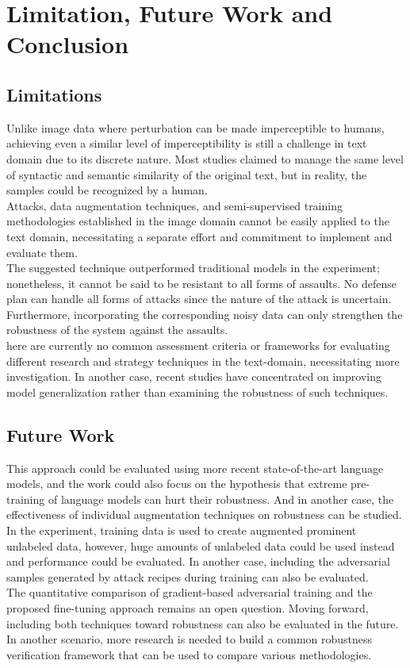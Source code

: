 \documentclass[%
	BCOR=8mm, %
	DIV=12,
	toc=bibliography, %
	toc=listof, %
	oneside, %
	egregdoesnotlikesansseriftitles, %
	]{scrbook}
\begin{document}
\chapter{Limitation, Future Work and Conclusion}
\label{chapter:conclusion}

\section{Limitations}
\label{section:limitations}
Unlike image data where perturbation can be made imperceptible to humans, achieving even a similar level of imperceptibility is still a challenge in text domain due to its discrete nature. Most studies claimed to manage the same level of syntactic and semantic similarity of the original text, but in reality, the samples could be recognized by a human.\\
Attacks, data augmentation techniques, and semi-supervised training methodologies established in the image domain cannot be easily applied to the text domain, necessitating a separate effort and commitment to implement and evaluate them.\\
The suggested technique outperformed traditional models in the experiment; nonetheless, it cannot be said to be resistant to all forms of assaults. No defense plan can handle all forms of attacks since the nature of the attack is uncertain. Furthermore, incorporating the corresponding noisy data can only strengthen the robustness of the system against the assaults.\\
here are currently no common assessment criteria or frameworks for evaluating different research and strategy techniques in the text-domain, necessitating more investigation. In another case, recent studies have concentrated on improving model generalization rather than examining the robustness of such techniques.


\section{Future Work }
\label{section:futurework}
This approach could be evaluated using more recent state-of-the-art language models, and the work could also focus on the hypothesis that extreme pre-training of language models can hurt their robustness. And in another case, the effectiveness of individual augmentation techniques on robustness can be studied.\\
In the experiment, training data is used to create augmented prominent unlabeled data, however,  huge amounts of unlabeled data could be used instead and performance could be evaluated. In another case, including the adversarial samples generated by attack recipes during training can also be evaluated. \\
The quantitative comparison of gradient-based adversarial training and the proposed fine-tuning approach remains an open question. Moving forward, including both techniques toward robustness can also be evaluated in the future. \\
In another scenario, more research is needed to build a common robustness verification framework that can be used to compare various methodologies.
 
\end{document}
